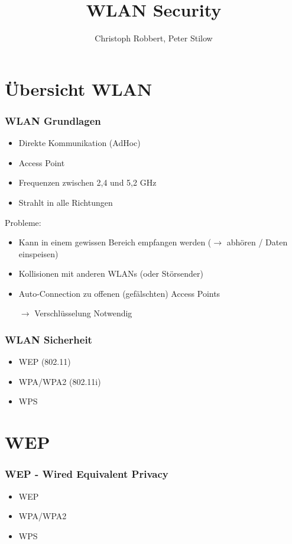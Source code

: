 \documentclass{beamer}
\author[C.Robbert, P. Stilow]{Christoph Robbert, Peter Stilow}
\institute[Uni Paderborn]{Universität Paderborn}
\title[WLAN Security]{WLAN Security}
\begin{document}
\begin{frame}
\maketitle
\end{frame}

\section{Übersicht WLAN}
\begin{frame}
\frametitle{WLAN Grundlagen}
\begin{itemize}
	\item Direkte Kommunikation (AdHoc)
	\item Access Point
	\item Frequenzen zwischen 2,4 und 5,2 GHz
	\item Strahlt in alle Richtungen
\end{itemize}
Probleme:
\begin{itemize}
	\item Kann in einem gewissen Bereich empfangen werden ($\rightarrow$ abhören / Daten einspeisen)
	\item Kollisionen mit anderen WLANs (oder Störsender)
	\item Auto-Connection zu offenen (gefälschten) Access Points
	\item[$\rightarrow$] Verschlüsselung Notwendig
\end{itemize}
\end{frame}

\begin{frame}
\frametitle{WLAN Sicherheit}
\begin{itemize}
	\item WEP (802.11)
	\item WPA/WPA2 (802.11i)
	\item WPS
\end{itemize}
\end{frame}

\section{WEP}
\begin{frame}
\frametitle{WEP - Wired Equivalent Privacy}
\begin{itemize}
	\item WEP
	\item WPA/WPA2
	\item WPS
\end{itemize}
\end{frame}
\end{document}
